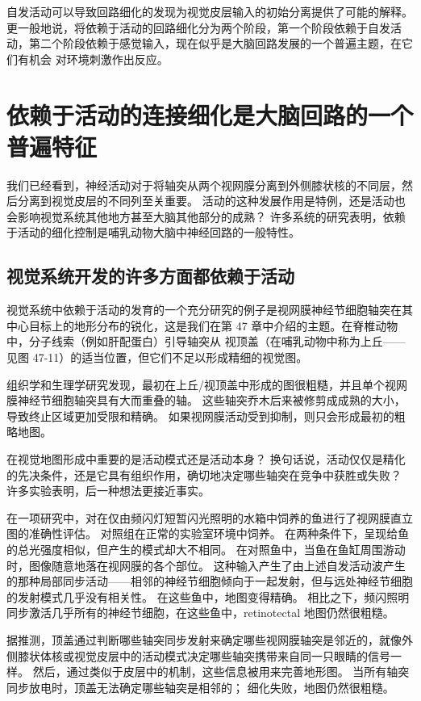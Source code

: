 自发活动可以导致回路细化的发现为视觉皮层输入的初始分离提供了可能的解释。 更一般地说，将依赖于活动的回路细化分为两个阶段，第一个阶段依赖于自发活动，第二个阶段依赖于感觉输入，现在似乎是大脑回路发展的一个普遍主题，在它们有机会 对环境刺激作出反应。

\section{依赖于活动的连接细化是大脑回路的一个普遍特征}
我们已经看到，神经活动对于将轴突从两个视网膜分离到外侧膝状核的不同层，然后分离到视觉皮层的不同列至关重要。 活动的这种发展作用是特例，还是活动也会影响视觉系统其他地方甚至大脑其他部分的成熟？ 许多系统的研究表明，依赖于活动的细化控制是哺乳动物大脑中神经回路的一般特性。

\subsection{视觉系统开发的许多方面都依赖于活动}
视觉系统中依赖于活动的发育的一个充分研究的例子是视网膜神经节细胞轴突在其中心目标上的地形分布的锐化，这是我们在第 47 章中介绍的主题。在脊椎动物中，分子线索（例如肝配蛋白）引导轴突从 视顶盖（在哺乳动物中称为上丘——见图 47-11）的适当位置，但它们不足以形成精细的视觉图。

组织学和生理学研究发现，最初在上丘/视顶盖中形成的图很粗糙，并且单个视网膜神经节细胞轴突具有大而重叠的轴。 这些轴突乔木后来被修剪成成熟的大小，导致终止区域更加受限和精确。 如果视网膜活动受到抑制，则只会形成最初的粗略地图。

在视觉地图形成中重要的是活动模式还是活动本身？ 换句话说，活动仅仅是精化的先决条件，还是它具有组织作用，确切地决定哪些轴突在竞争中获胜或失败？ 许多实验表明，后一种想法更接近事实。

在一项研究中，对在仅由频闪灯短暂闪光照明的水箱中饲养的鱼进行了视网膜直立图的准确性评估。 对照组在正常的实验室环境中饲养。 在两种条件下，呈现给鱼的总光强度相似，但产生的模式却大不相同。 在对照鱼中，当鱼在鱼缸周围游动时，图像随意地落在视网膜的各个部位。 这种输入产生了由上述自发活动波产生的那种局部同步活动——相邻的神经节细胞倾向于一起发射，但与远处神经节细胞的发射模式几乎没有相关性。 在这些鱼中，地图变得精确。 相比之下，频闪照明同步激活几乎所有的神经节细胞，在这些鱼中，retinotectal 地图仍然很粗糙。

据推测，顶盖通过判断哪些轴突同步发射来确定哪些视网膜轴突是邻近的，就像外侧膝状体核或视觉皮层中的活动模式决定哪些轴突携带来自同一只眼睛的信号一样。 然后，通过类似于皮层中的机制，这些信息被用来完善地形图。 当所有轴突同步放电时，顶盖无法确定哪些轴突是相邻的； 细化失败，地图仍然很粗糙。


